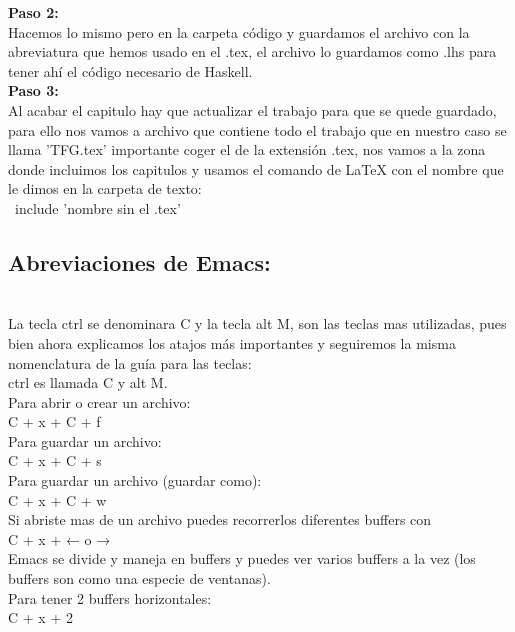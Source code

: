 \textbf{Paso 2:}\\
Hacemos lo mismo pero en la carpeta código y guardamos el archivo con la abreviatura que hemos usado en el .tex, el archivo lo guardamos como .lhs para tener ahí el código necesario de Haskell. \\

\textbf{Paso 3:}\\
Al acabar el capitulo hay que actualizar el trabajo para que se quede guardado, para ello nos vamos a archivo que contiene todo el trabajo que en nuestro caso se llama 'TFG.tex' importante coger el de la extensión .tex, nos vamos a la zona donde incluimos los capitulos y usamos el comando de LaTeX con el nombre que le dimos en la carpeta de texto:\\

\ include {'nombre sin el .tex'}\\



\subsection{Abreviaciones de Emacs:}\\

La tecla ctrl se denominara C y la tecla alt M, son las teclas mas utilizadas, pues bien ahora explicamos los atajos más importantes y seguiremos la misma nomenclatura de la guía para las teclas:\\

ctrl es llamada C y alt M.\\

Para abrir o crear un archivo:\\
C + x + C + f\\

Para guardar un archivo:\\
C + x + C + s\\

Para guardar un archivo (guardar como):\\
C + x + C + w\\

Si abriste mas de un archivo puedes recorrerlos diferentes buffers con\\
C + x + ← o →\\

Emacs se divide y maneja en buffers y puedes ver varios buffers a la vez (los buffers son como una especie de ventanas).\\

Para tener 2 buffers horizontales:\\
C + x + 2\\

